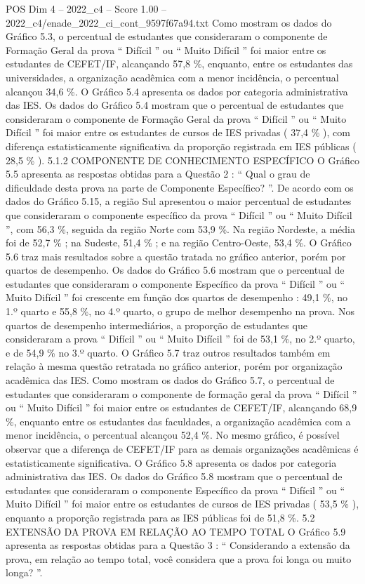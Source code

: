 \begin{textsample}{POS Dim 4 – 2022\_c4 – Score 1.00 – 2022\_c4/enade\_2022\_ci\_cont\_9597f67a94.txt}
Como mostram os dados do Gráfico 5.3, o percentual de estudantes que consideraram o componente de Formação Geral da prova “ Difícil ” ou “ Muito Difícil ” foi maior entre os estudantes de CEFET/IF, alcançando 57,8 \%, enquanto, entre os estudantes das universidades, a organização acadêmica com a menor incidência, o percentual alcançou 34,6 \%.
O Gráfico 5.4 apresenta os dados por categoria administrativa das IES.
Os dados do Gráfico 5.4 mostram que o percentual de estudantes que consideraram o componente de Formação Geral da prova “ Difícil ” ou “ Muito Difícil ” foi maior entre os estudantes de cursos de IES privadas ( 37,4 \% ), com diferença estatisticamente significativa da proporção registrada em IES públicas ( 28,5 \% ). 5.1.2 COMPONENTE DE CONHECIMENTO ESPECÍFICO O Gráfico 5.5 apresenta as respostas obtidas para a Questão 2 : “ Qual o grau de dificuldade desta prova na parte de Componente Específico? ”.
De acordo com os dados do Gráfico 5.15, a região Sul apresentou o maior percentual de estudantes que consideraram o componente específico da prova “ Difícil ” ou “ Muito Difícil ”, com 56,3 \%, seguida da região Norte com 53,9 \%.
Na região Nordeste, a média foi de 52,7 \% ; na Sudeste, 51,4 \% ; e na região Centro-Oeste, 53,4 \%.
O Gráfico 5.6 traz mais resultados sobre a questão tratada no gráfico anterior, porém por quartos de desempenho.
Os dados do Gráfico 5.6 mostram que o percentual de estudantes que consideraram o componente Específico da prova “ Difícil ” ou “ Muito Difícil ” foi crescente em função dos quartos de desempenho : 49,1 \%, no 1.º quarto e 55,8 \%, no 4.º quarto, o grupo de melhor desempenho na prova.
Nos quartos de desempenho intermediários, a proporção de estudantes que consideraram a prova “ Difícil ” ou “ Muito Difícil ” foi de 53,1 \%, no 2.º quarto, e de 54,9 \% no 3.º quarto.
O Gráfico 5.7 traz outros resultados também em relação à mesma questão retratada no gráfico anterior, porém por organização acadêmica das IES.
Como mostram os dados do Gráfico 5.7, o percentual de estudantes que consideraram o componente de formação geral da prova “ Difícil ” ou “ Muito Difícil ” foi maior entre os estudantes de CEFET/IF, alcançando 68,9 \%, enquanto entre os estudantes das faculdades, a organização acadêmica com a menor incidência, o percentual alcançou 52,4 \%.
No mesmo gráfico, é possível observar que a diferença de CEFET/IF para as demais organizações acadêmicas é estatisticamente significativa.
O Gráfico 5.8 apresenta os dados por categoria administrativa das IES.
Os dados do Gráfico 5.8 mostram que o percentual de estudantes que consideraram o componente Específico da prova “ Difícil ” ou “ Muito Difícil ” foi maior entre os estudantes de cursos de IES privadas ( 53,5 \% ), enquanto a proporção registrada para as IES públicas foi de 51,8 \%. 5.2 EXTENSÃO DA PROVA EM RELAÇÃO AO TEMPO TOTAL O Gráfico 5.9 apresenta as respostas obtidas para a Questão 3 : “ Considerando a extensão da prova, em relação ao tempo total, você considera que a prova foi longa ou muito longa? ”.

\end{textsample}
